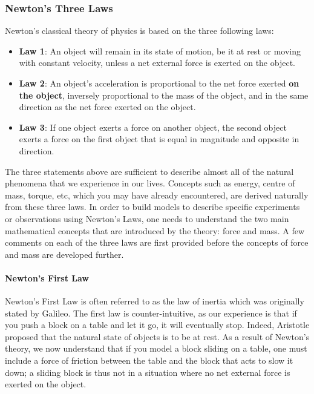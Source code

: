 \subsubsection{Newton's Three Laws}

Newton's classical theory of physics is based on the three following laws:

\begin{itemize}
\item \textbf{Law 1}: An object will remain in its state of motion, be it at rest or moving with constant velocity, unless a net external force is exerted on the object.
\item \textbf{Law 2}: An object's acceleration is proportional to the net force exerted \textbf{on the object}, inversely proportional to the mass of the object, and in the same direction as the net force exerted on the object.
\item \textbf{Law 3}: If one object exerts a force on another object, the second object exerts a force on the first object that is equal in magnitude and opposite in direction.
\end{itemize}

The three statements above are sufficient to describe almost all of the natural phenomena that we experience in our lives. Concepts such as energy, centre of mass, torque, etc, which you may have already encountered, are derived naturally from these three laws. In order to build models to describe specific experiments or observations using Newton's Laws, one needs to understand the two main mathematical concepts that are introduced by the theory: force and mass. A few comments on each of the three laws are first provided before the concepts of force and mass are developed further.

\paragraph{Newton's First Law}

Newton's First Law is often referred to as the law of inertia which was originally stated by Galileo. The first law is counter-intuitive, as our experience is that if you push a block on a table and let it go, it will eventually stop. Indeed, Aristotle proposed that the natural state of objects is to be at rest. As a result of Newton's theory, we now understand that if you model a block sliding on a table, one must include a force of friction between the table and the block that acts to slow it down; a sliding block is thus not in a situation where no net external force is exerted on the object.

